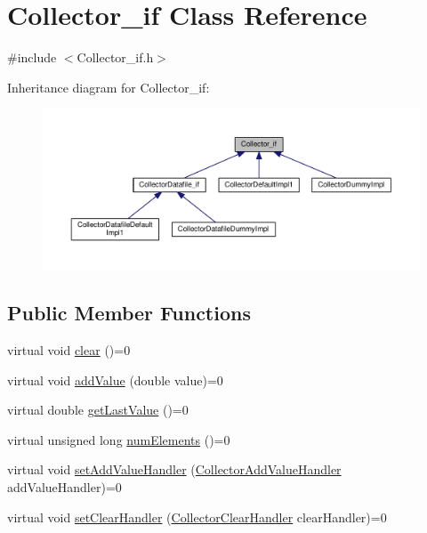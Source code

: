 \hypertarget{class_collector__if}{}\section{Collector\+\_\+if Class Reference}
\label{class_collector__if}


{\ttfamily \#include $<$Collector\+\_\+if.\+h$>$}



Inheritance diagram for Collector\+\_\+if\+:\nopagebreak
\begin{figure}[H]
\begin{center}
\leavevmode
\includegraphics[width=350pt]{class_collector__if__inherit__graph}
\end{center}
\end{figure}
\subsection*{Public Member Functions}
\begin{DoxyCompactItemize}
\item 
virtual void \hyperlink{class_collector__if_a035bd1300c85866870c2f6178a9528e8}{clear} ()=0
\item 
virtual void \hyperlink{class_collector__if_ac7b83bce8ddb4903d247c1eddd656171}{add\+Value} (double value)=0
\item 
virtual double \hyperlink{class_collector__if_aa14f7e1065af8fd38ab592e224fb7e43}{get\+Last\+Value} ()=0
\item 
virtual unsigned long \hyperlink{class_collector__if_a97fa632508ffdfad1365b3a949acf745}{num\+Elements} ()=0
\item 
virtual void \hyperlink{class_collector__if_a71e66a9bb8a91832ec7a05a1fe00519e}{set\+Add\+Value\+Handler} (\hyperlink{_collector__if_8h_ab97c9a368c50eb9e00cb4772e46ff38a}{Collector\+Add\+Value\+Handler} add\+Value\+Handler)=0
\item 
virtual void \hyperlink{class_collector__if_ac03e3c41ccfe3aff6f6a0b3aca8c885b}{set\+Clear\+Handler} (\hyperlink{_collector__if_8h_ad22205bb584ed3e0db55fc265a5fe1f4}{Collector\+Clear\+Handler} clear\+Handler)=0
\end{DoxyCompactItemize}


